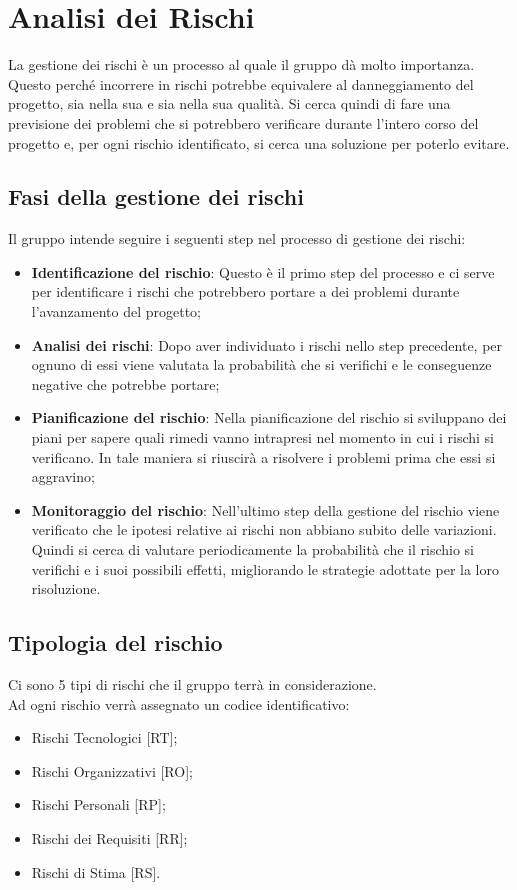 \section{Analisi dei Rischi}
La gestione dei rischi è un processo al quale il gruppo \Gruppo{} dà molto importanza. Questo perché incorrere in rischi potrebbe equivalere al danneggiamento del progetto, sia nella sua  e sia nella sua qualità.
Si cerca quindi di fare una previsione dei problemi che si potrebbero verificare durante l'intero corso del progetto e, per ogni rischio identificato, si cerca una soluzione per poterlo evitare.

\subsection{Fasi della gestione dei rischi}
Il gruppo intende seguire i seguenti step nel processo di gestione dei rischi:
\begin{itemize}
	\item \textbf{Identificazione del rischio}: Questo è il primo step del processo e ci serve per identificare i rischi che potrebbero portare a dei problemi durante l'avanzamento del progetto; 
	\item \textbf{Analisi dei rischi}: Dopo aver individuato i rischi nello step precedente, per ognuno di essi viene valutata la probabilità che si verifichi e le conseguenze negative che potrebbe portare;
	\item \textbf{Pianificazione del rischio}: Nella pianificazione del rischio si sviluppano dei piani per sapere quali rimedi vanno intrapresi nel momento in cui i rischi si verificano. In tale maniera si riuscirà a risolvere i problemi prima che essi si aggravino;
	\item \textbf{Monitoraggio del rischio}: Nell'ultimo step della gestione del rischio viene verificato che le ipotesi relative ai rischi non abbiano subito delle variazioni. Quindi si cerca di valutare periodicamente la probabilità che il rischio si verifichi e i suoi possibili effetti, migliorando le strategie adottate per la loro risoluzione.
\end{itemize}

\subsection{Tipologia del rischio}
Ci sono 5 tipi di rischi che il gruppo \Gruppo{} terrà in considerazione. 
\\Ad ogni rischio verrà assegnato un codice identificativo:
\begin{itemize}
	\item Rischi Tecnologici [RT];
	\item Rischi Organizzativi [RO];
	\item Rischi Personali [RP];
	\item Rischi dei Requisiti [RR];
	\item Rischi di Stima [RS].
\end{itemize}

